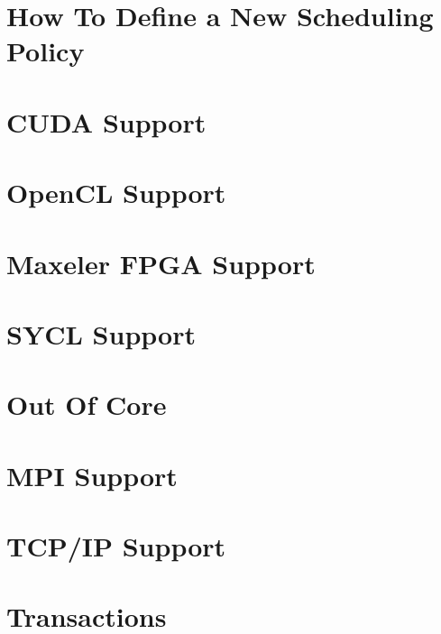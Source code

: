 \chapter{How To Define a New Scheduling Policy}
\label{HowToDefineANewSchedulingPolicy}
\hypertarget{HowToDefineANewSchedulingPolicy}{}


\chapter{CUDA Support}
\label{CUDASupport}
\hypertarget{CUDASupport}{}


\chapter{OpenCL Support}
\label{OpenCLSupport}
\hypertarget{OpenCLSupport}{}


\chapter{Maxeler FPGA Support}
\label{MaxFPGASupport}
\hypertarget{MaxFPGASupport}{}


\chapter{SYCL Support}
\label{SYCLSupport}
\hypertarget{SYCLSupport}{}


\chapter{Out Of Core}
\label{OutOfCore}
\hypertarget{OutOfCore}{}


\chapter{MPI Support}
\label{MPISupport}
\hypertarget{MPISupport}{}


\chapter{TCP/IP Support}
\label{TCPIPSupport}
\hypertarget{TCPIPSupport}{}


\chapter{Transactions}
\label{Transactions}
\hypertarget{Transactions}{}


